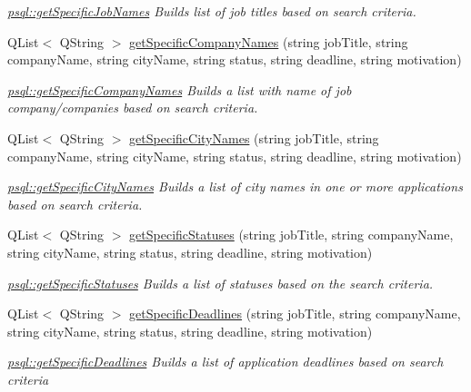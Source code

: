 \begin{DoxyCompactItemize}
\begin{DoxyCompactList}\small\item\em \mbox{\hyperlink{classpsql_a029f2ef38c4156cc6c67765900c8245f}{psql\+::get\+Specific\+Job\+Names}} Builds list of job titles based on search criteria. \end{DoxyCompactList}\item 
Q\+List$<$ Q\+String $>$ \mbox{\hyperlink{classpsql_ac2528de5054ba99371d2d796ed32b2b1}{get\+Specific\+Company\+Names}} (string job\+Title, string company\+Name, string city\+Name, string status, string deadline, string motivation)
\begin{DoxyCompactList}\small\item\em \mbox{\hyperlink{classpsql_ac2528de5054ba99371d2d796ed32b2b1}{psql\+::get\+Specific\+Company\+Names}} Builds a list with name of job company/companies based on search criteria. \end{DoxyCompactList}\item 
Q\+List$<$ Q\+String $>$ \mbox{\hyperlink{classpsql_aace910a1e695138795d6e41765908784}{get\+Specific\+City\+Names}} (string job\+Title, string company\+Name, string city\+Name, string status, string deadline, string motivation)
\begin{DoxyCompactList}\small\item\em \mbox{\hyperlink{classpsql_aace910a1e695138795d6e41765908784}{psql\+::get\+Specific\+City\+Names}} Builds a list of city names in one or more applications based on search criteria. \end{DoxyCompactList}\item 
Q\+List$<$ Q\+String $>$ \mbox{\hyperlink{classpsql_aa04154eae71d7cdfd0fb8ab67ac032e7}{get\+Specific\+Statuses}} (string job\+Title, string company\+Name, string city\+Name, string status, string deadline, string motivation)
\begin{DoxyCompactList}\small\item\em \mbox{\hyperlink{classpsql_aa04154eae71d7cdfd0fb8ab67ac032e7}{psql\+::get\+Specific\+Statuses}} Builds a list of statuses based on the search criteria. \end{DoxyCompactList}\item 
Q\+List$<$ Q\+String $>$ \mbox{\hyperlink{classpsql_a415ebb495b96ac805880401555f72825}{get\+Specific\+Deadlines}} (string job\+Title, string company\+Name, string city\+Name, string status, string deadline, string motivation)
\begin{DoxyCompactList}\small\item\em \mbox{\hyperlink{classpsql_a415ebb495b96ac805880401555f72825}{psql\+::get\+Specific\+Deadlines}} Builds a list of application deadlines based on search criteria \end{DoxyCompactList}\item 

\end{DoxyCompactItemize}
